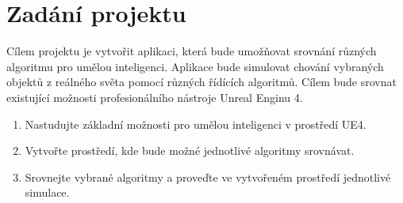 \section{Zadání projektu}
Cílem projektu je vytvořit aplikaci, která bude umožňovat srovnání různých algoritmu pro umělou inteligenci. Aplikace bude simulovat chování vybraných objektů z reálného světa pomocí různých řídících algoritmů. Cílem bude srovnat existující možnosti profesionálního nástroje Unreal Enginu 4.

\begin{enumerate}
\item Nastudujte základní možnosti pro umělou inteligenci v prostředí UE4.
\item Vytvořte prostředí, kde bude možné jednotlivé algoritmy srovnávat.
\item Srovnejte vybrané algoritmy a proveďte ve vytvořeném prostředí jednotlivé simulace.
\end{enumerate}